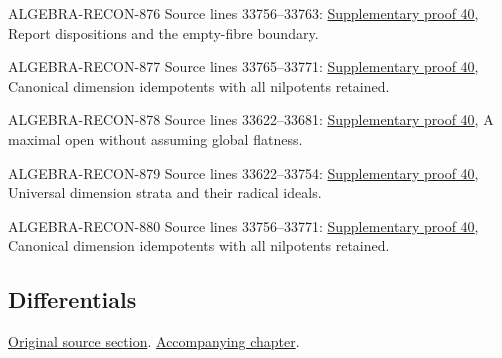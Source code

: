 \begin{AlgebraSourceRoutes}
\item[ALGEBRA-RECON-876] Source lines 33756--33763: \hyperlink{algebra_cm_open_notes_20260928}{Supplementary proof 40}, Report dispositions and the empty-fibre boundary.
\item[ALGEBRA-RECON-877] Source lines 33765--33771: \hyperlink{algebra_cm_open_notes_20260928}{Supplementary proof 40}, Canonical dimension idempotents with all nilpotents retained.
\item[ALGEBRA-RECON-878] Source lines 33622--33681: \hyperlink{algebra_cm_open_notes_20260928}{Supplementary proof 40}, A maximal open without assuming global flatness.
\item[ALGEBRA-RECON-879] Source lines 33622--33754: \hyperlink{algebra_cm_open_notes_20260928}{Supplementary proof 40}, Universal dimension strata and their radical ideals.
\item[ALGEBRA-RECON-880] Source lines 33756--33771: \hyperlink{algebra_cm_open_notes_20260928}{Supplementary proof 40}, Canonical dimension idempotents with all nilpotents retained.
\end{AlgebraSourceRoutes}

\subsection{Differentials}
\hypertarget{algebra-source-section-differentials}{}
\noindent\href{https://github.com/stacks/stacks-project/blob/a04446e57ec1fbc252a871afcec7752fb2807b14/algebra.tex\#L33788}{Original source section}. \href{algebra.pdf\#nameddest=section-differentials}{Accompanying chapter}.

